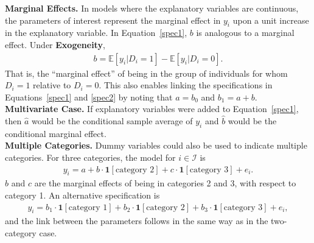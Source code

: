 \noindent \textbf{Marginal Effects.} In models where the explanatory variables are continuous, the parameters of interest represent the marginal effect in $y_i$ upon a unit increase in the explanatory variable. In Equation~\eqref{spec1}, $b$ is analogous to a marginal effect. Under \textbf{Exogeneity}, 
\begin{align}
	b = \mathbb{E} \left[ y_i | D_i = 1 \right] - \mathbb{E} \left[ y_i | D_i = 0 \right]. 
\end{align}
\noindent That is, the ``marginal effect'' of being in the group of individuals for whom $D_i = 1$ relative to $D_i = 0$. This also enables linking the specifications in Equations~\eqref{spec1} and \eqref{spec2} by noting that $a = b_0$ and $b_1 = a + b$.\\

\noindent \textbf{Multivariate Case.} If explanatory variables were added to Equation~\eqref{spec1}, then $\hat{a}$ would be the conditional sample average of $y_i$ and $\hat{b}$ would be the conditional marginal effect.\\ 

\noindent \textbf{Multiple Categories.} Dummy variables could also be used to indicate multiple  categories. For three categories, the model for $i \in \mathcal{I}$ is
\begin{align}
	y_i = a + b \cdot \bm{1} \left[ \text{category 2} \right] +  c \cdot \bm{1} \left[ \text{category 3} \right] + e_i \label{spec3}. 
\end{align}
\noindent $b$ and $c$ are the marginal effects of being in categories 2 and 3, with respect to category 1. An alternative specification is
\begin{align}
	y_i = b_1 \cdot \bm{1} \left[ \text{category 1} \right] + b_2 \cdot \bm{1} \left[ \text{category 2} \right] + b_3 \cdot  \bm{1} \left[ \text{category 3} \right] + e_i \label{spec4}, 
\end{align}
\noindent and the link between the parameters follows in the same way as in the two-category case. 
